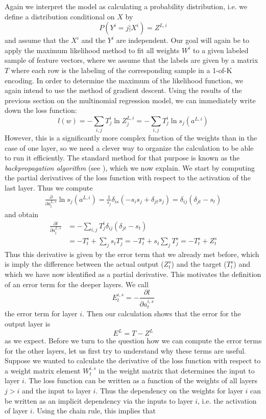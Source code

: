 \documentclass[a4paper, draft]{report}
\numberwithin{section}{chapter}
\numberwithin{equation}{chapter}
\theoremstyle{own}
\theoremstyle{remark}
\begin{document}
Again we interpret the model as calculating a probability distribution, i.e. we define a distribution conditional on $X$ by
$$
P(Y^i = j | X^i ) = Z^{L,i}
$$
and assume that the $X^i$ and the $Y^i$ are independent. Our goal will again be to apply the maximum likelihood method to fit all weights $W^i$ to a given labeled sample of feature vectors, where we assume that the labels are given by a matrix $T$ where each row is the labeling of the corresponding sample in a 1-of-K encoding. In order to determine the maximum of the likelihood function, we again intend to use the method of gradient descent. Using the results of the previous section on the multinomial regression model, we can immediately write down the loss function:
$$
l(w) = - \sum_{i,j} T^i_j \ln Z^{L,i}_j = - \sum_{i,j} T^i_j \ln s_j (a^{L,i}) 
$$
However, this is a significantly more complex function of the weights than in the case of one layer, so we need a clever way to organize the calculation to be able to run it efficiently. The standard method for that purpose is known as the {\em backpropagation algorithm} (see \cite{RHW}), which we now explain. We start by computing the partial derivatives of the loss function with respect to the activation of the last layer. Thus we compute
\begin{align*}
\frac{\partial}{\partial a^{L,s}_t} \ln s_j(a^{L,i}) = \frac{1}{s_j} \delta_{is} (-s_i s_j + \delta_{jt} s_j) = \delta_{ij} (\delta_{jt} - s_t)
\end{align*}
and obtain
\begin{align*}
\frac{\partial l}{\partial a^{L,s}_t} &= - \sum_{i,j} T^i_j \delta_{ij} (\delta_{jt} - s_t) \\
&= - T^s_t + \sum_j s_t T^s_j = - T^s_t + s_t \sum_j T^s_j = - T^s_t + Z^s_t
\end{align*}
Thus this derivative is given by the error term that we already met before, which is imply the difference between the actual output ($Z^s_t$) and the target ($T^s_t$) and which we have now identified as a partial derivative. This motivates the definition of an error term for the deeper layers. We call
$$
E^{i,s}_t = - \frac{\partial l}{\partial a^{i,s}_t}
$$
the error term for layer $i$. Then our calculation shows that the error for the output layer is
$$
E^L = T - Z^L 
$$
as we expect. Before we turn to the question how we can compute the error terms for the other layers, let us first try to understand why these terms are useful. Suppose we wanted to calculate the derivative of the loss function with respect to a weight matrix element $W^{i,s}_t$ in the weight matrix that determines the input to layer $i$. The loss function can be written as a function of the weights of all layers $j > i$ and the input to layer $i$. Thus the dependency on the weights for layer $i$ can be written as an implicit dependency via the inputs to layer $i$, i.e. the activation of layer $i$. Using the chain rule, this implies that
\end{document}
